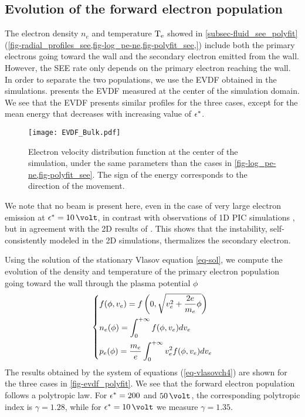 \subsection{Evolution of the forward electron population} \label{subsec-EVDF_see_polyfit}

The electron density $n_e$ and  temperature $\mathrm{T_e}$ showed in \cref{subsec-fluid_see_polyfit} (\cref{fig-radial_profiles_see,fig-log_pe-ne,fig-polyfit_see,}) include both the primary electrons going toward the wall and the secondary electron emitted from the wall.
However, the \ac{SEE} rate only depends on the primary electron reaching the wall.
In order to separate the two populations, we use the \ac{EVDF} obtained in the simulations.
 presents the \ac{EVDF} measured at the center of the simulation domain. 
We see that the \ac{EVDF} presents similar profiles for the three cases, except for the mean energy that decreases with increasing value of $\epsilon^{*}$.
\begin{figure}[!hbt]
  \centering
  \texttt{[image: EVDF\_Bulk.pdf]}
  \caption{Electron velocity distribution function at the center of the simulation, under the same parameters than the cases in \cref{fig-log_pe-ne,fig-polyfit_see}. The sign of the energy corresponds to the direction of the movement.}
  \label{fig-evdf_epsstar}
\end{figure}

We note that no beam is present here, even in the case of very large electron emission at $\crover=10\,\volt$, in contrast with observations of \ac{1D} PIC simulations \citep{sydorenko2006b,sydorenko2007}, but in agreement with the \ac{2D} results of \citet{heron2013}.
This shows that the instability, self-consistently modeled in the \ac{2D} simulations, thermalizes the secondary electron.

Using the solution of the stationary Vlasov equation \cref{eq-sol}, we compute the evolution of the density and temperature of the primary electron population going toward the wall through the plasma potential $\phi$ 
\begin{equation} \label{eq-vlasovch4}
  \begin{dcases}
    f(\phi, v_e) = f \left( 0, \sqrt{v_e^2 + \frac{2 e}{m_e} \phi} \right) \\
    n_e(\phi) = \int_0^{+\infty} f(\phi, v_e) dv_e \\
    p_e(\phi) = \frac{m_e}{e} \int_0^{+\infty} v_e^2 f(\phi, v_e) dv_e \\
  \end{dcases}
\end{equation}
The results obtained by the system of equations (\ref{eq-vlasovch4}) are shown for the three cases in \cref{fig-evdf_polyfit}.
We see that the forward electron population follows a polytropic law.
For $\epsilon^{*}= 200$ and $50\,\volt$, the corresponding polytropic index is $\gamma=1.28$, while for $\crover= 10\,\volt$ we measure $\gamma=1.35$.

